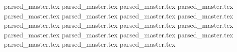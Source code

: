 \documentclass[a4paper]{article}
\begin{document}
\tableofcontents{}
{parsed_master.tex}	
{parsed_master.tex}	
{parsed_master.tex}	
{parsed_master.tex}	
{parsed_master.tex}	
{parsed_master.tex}	
{parsed_master.tex}	
{parsed_master.tex}	
{parsed_master.tex}	
{parsed_master.tex}	
{parsed_master.tex}	
{parsed_master.tex}	
{parsed_master.tex}	
{parsed_master.tex}	
{parsed_master.tex}	
{parsed_master.tex}	
{parsed_master.tex}	
{parsed_master.tex}	
{parsed_master.tex}	
\end{document}
